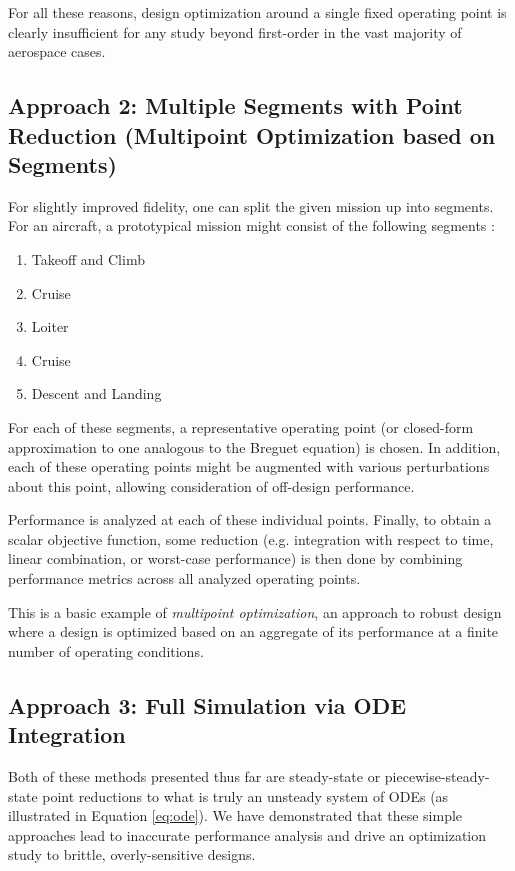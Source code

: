 For all these reasons, design optimization around a single fixed operating point is clearly insufficient for any study beyond first-order in the vast majority of aerospace cases.


\subsection{Approach 2: Multiple Segments with Point Reduction (Multipoint Optimization based on Segments)}

For slightly improved fidelity, one can split the given mission up into segments. For an aircraft, a prototypical mission might consist of the following segments \cite{raymer}:

\begin{enumerate}[noitemsep]
    \item Takeoff and Climb
    \item Cruise
    \item Loiter
    \item Cruise
    \item Descent and Landing
\end{enumerate}

For each of these segments, a representative operating point (or closed-form approximation to one analogous to the Breguet equation) is chosen. In addition, each of these operating points might be augmented with various perturbations about this point, allowing consideration of off-design performance.

Performance is analyzed at each of these individual points. Finally, to obtain a scalar objective function, some reduction (e.g. integration with respect to time, linear combination, or worst-case performance) is then done by combining performance metrics across all analyzed operating points.

This is a basic example of \textit{multipoint optimization}, an approach to robust design where a design is optimized based on an aggregate of its performance at a finite number of operating conditions.


\subsection{Approach 3: Full Simulation via ODE Integration}
\label{sect:dynamics-ode}

Both of these methods presented thus far are steady-state or piecewise-steady-state point reductions to what is truly an unsteady system of ODEs (as illustrated in Equation \ref{eq:ode}). We have demonstrated that these simple approaches lead to inaccurate performance analysis and drive an optimization study to brittle, overly-sensitive designs.

